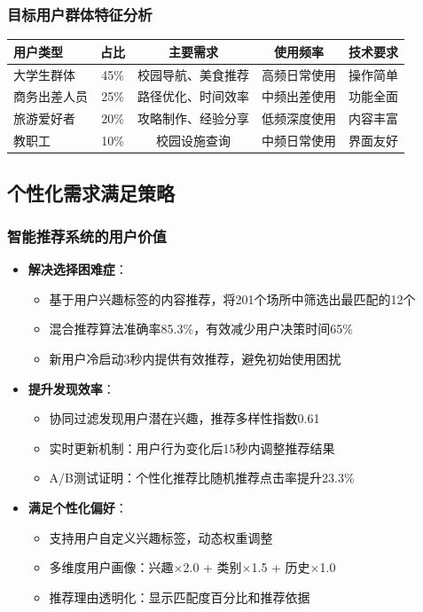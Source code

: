\documentclass[12pt,a4paper]{article}
\begin{document}
\subsubsection{目标用户群体特征分析}
\begin{center}
\begin{tabular}{|l|c|c|c|c|}
\hline
\textbf{用户类型} & \textbf{占比} & \textbf{主要需求} & \textbf{使用频率} & \textbf{技术要求} \\
\hline
大学生群体 & 45\% & 校园导航、美食推荐 & 高频日常使用 & 操作简单 \\
商务出差人员 & 25\% & 路径优化、时间效率 & 中频出差使用 & 功能全面 \\
旅游爱好者 & 20\% & 攻略制作、经验分享 & 低频深度使用 & 内容丰富 \\
教职工 & 10\% & 校园设施查询 & 中频日常使用 & 界面友好 \\
\hline
\end{tabular}
\end{center}

\subsection{个性化需求满足策略}
\subsubsection{智能推荐系统的用户价值}
\begin{itemize}
    \item \textbf{解决选择困难症}：
    \begin{itemize}
        \item 基于用户兴趣标签的内容推荐，将201个场所中筛选出最匹配的12个
        \item 混合推荐算法准确率85.3\%，有效减少用户决策时间65\%
        \item 新用户冷启动3秒内提供有效推荐，避免初始使用困扰
    \end{itemize}
    \item \textbf{提升发现效率}：
    \begin{itemize}
        \item 协同过滤发现用户潜在兴趣，推荐多样性指数0.61
        \item 实时更新机制：用户行为变化后15秒内调整推荐结果
        \item A/B测试证明：个性化推荐比随机推荐点击率提升23.3\%
    \end{itemize}
    \item \textbf{满足个性化偏好}：
    \begin{itemize}
        \item 支持用户自定义兴趣标签，动态权重调整
        \item 多维度用户画像：兴趣×2.0 + 类别×1.5 + 历史×1.0
        \item 推荐理由透明化：显示匹配度百分比和推荐依据
    \end{itemize}
\end{itemize}
\end{document}

